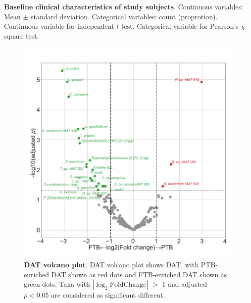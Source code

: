 \documentclass[11pt, a4paper, onecolumn, oneside]{report}
\begin{document}
            \begin{table}[p]
                \centering

                \caption[Baseline clinical characteristics of study subjects]{\textbf{Baseline clinical characteristics of study subjects}. Continuous variables: Mean $\pm$ standard deviation. Categorical variables: count (proprotion). Continuous variable for independent $t$-test. Categorical variable for Pearson’s $\chi$-square test.}
                \label{tab:PTB-clinical}
            \end{table}
            \clearpage

            \begin{figure}[p]
                \centering
                \includegraphics[width=12 cm]{Figures/PTB/Fig1-DAT.pdf}
                \caption[DAT volcano plot]{\textbf{DAT volcano plot}. DAT volcano plot shows DAT, with PTB-enriched DAT shown as red dots and FTB-enriched DAT shown as green dots. Taxa with $| \log _2 \textrm{FoldChange} |$ $>$ 1 and adjusted $p < 0.05$ are considered as significant different.}
                \label{fig:PTB-DAT}
            \end{figure}
            \clearpage
\end{document}
